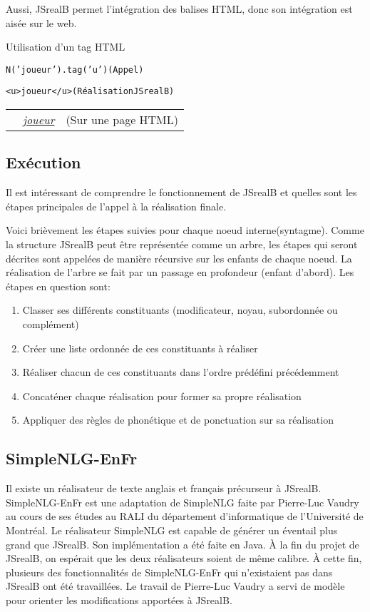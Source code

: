\documentclass[11pt]{article} %
\newcommand{\system}[1]{\textsf{#1}}
\newcommand{\JSB}{\system{JSrealB}}
\newcommand{\real}[1]{\emph{#1}}
\begin{document}
Aussi, \JSB{} permet l'intégration des balises HTML, donc son intégration
est aisée sur le web. \\
\begin{example}
\caption{Utilisation d'un tag HTML}
\begin{alltt}
  N('joueur').tag('u')    \textnormal{(Appel)}
    
  <u>joueur</u>           \textnormal{(Réalisation \JSB{})}
\end{alltt}
\begin{tabular}{p{0.4cm} p{3.8cm} c}
 & \real{\underline{joueur}} & (Sur une page HTML)
\end{tabular}
\end{example}

\subsection{Exécution}
\label{subsec:exec}

Il est intéressant de comprendre le fonctionnement de \JSB{} et quelles
sont les étapes principales de l'appel à la réalisation finale.

Voici brièvement les étapes suivies pour chaque noeud interne(syntagme).
Comme la structure \JSB{} peut être représentée comme un arbre, les
étapes qui seront décrites sont appelées de manière récursive sur les
enfants de chaque noeud. La réalisation de l'arbre se fait par un
passage en profondeur (enfant d'abord). Les étapes en question sont:
\begin{enumerate}
\item Classer ses différents constituants (modificateur, noyau, subordonnée
ou complément)
\item Créer une liste ordonnée de ces constituants à réaliser
\item Réaliser chacun de ces constituants dans l'ordre prédéfini précédemment
\item Concaténer chaque réalisation pour former sa propre réalisation
\item Appliquer des règles de phonétique et de ponctuation sur sa réalisation
\end{enumerate}

\subsection{\system{SimpleNLG-EnFr}}

Il existe un réalisateur de texte anglais et français précurseur à
\JSB{}. SimpleNLG-EnFr est une adaptation de \system{SimpleNLG} faite par Pierre-Luc
Vaudry au cours de ses études au RALI du département d'informatique
de l'Université de Montréal. Le réalisateur \system{SimpleNLG} est capable
de générer un éventail plus grand que \JSB{}. Son implémentation
a été faite en Java. À la fin du projet de \JSB{}, on espérait que
les deux réalisateurs soient de même calibre. À cette fin, plusieurs
des fonctionnalités de \system{SimpleNLG-EnFr} qui n'existaient pas dans \JSB{}
ont été travaillées. Le travail de Pierre-Luc Vaudry a servi de modèle
pour orienter les modifications apportées à \JSB{}.
\end{document}
